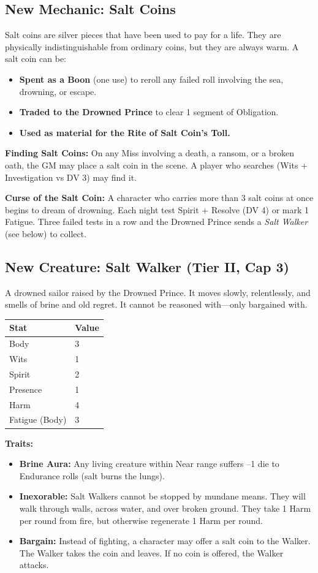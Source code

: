 \documentclass[12pt]{article}
\begin{document}
\subsection{New Mechanic: Salt Coins}
Salt coins are silver pieces that have been used to pay for a life. They are physically indistinguishable from ordinary coins, but they are always warm. A salt coin can be:
\begin{itemize}
  \item \textbf{Spent as a Boon} (one use) to reroll any failed roll involving the sea, drowning, or escape.
  \item \textbf{Traded to the Drowned Prince} to clear 1 segment of Obligation.
  \item \textbf{Used as material for the Rite of Salt Coin’s Toll.}
\end{itemize}

\textbf{Finding Salt Coins:} On any Miss involving a death, a ransom, or a broken oath, the GM may place a salt coin in the scene. A player who searches (Wits + Investigation vs DV 3) may find it.

\textbf{Curse of the Salt Coin:} A character who carries more than 3 salt coins at once begins to dream of drowning. Each night test Spirit + Resolve (DV 4) or mark 1 Fatigue. Three failed tests in a row and the Drowned Prince sends a \textit{Salt Walker} (see below) to collect.

\subsection{New Creature: Salt Walker (Tier II, Cap 3)}
A drowned sailor raised by the Drowned Prince. It moves slowly, relentlessly, and smells of brine and old regret. It cannot be reasoned with—only bargained with.

\begin{center}
\begin{tabular}{@{}ll@{}}
\toprule
\textbf{Stat} & \textbf{Value} \\
\midrule
Body & 3 \\
Wits & 1 \\
Spirit & 2 \\
Presence & 1 \\
Harm & 4 \\
Fatigue (Body) & 3 \\
\bottomrule
\end{tabular}
\end{center}

\textbf{Traits:}
\begin{itemize}
  \item \textbf{Brine Aura:} Any living creature within Near range suffers –1 die to Endurance rolls (salt burns the lungs).
  \item \textbf{Inexorable:} Salt Walkers cannot be stopped by mundane means. They will walk through walls, across water, and over broken ground. They take 1 Harm per round from fire, but otherwise regenerate 1 Harm per round.
  \item \textbf{Bargain:} Instead of fighting, a character may offer a salt coin to the Walker. The Walker takes the coin and leaves. If no coin is offered, the Walker attacks.
\end{itemize}
\end{document}
